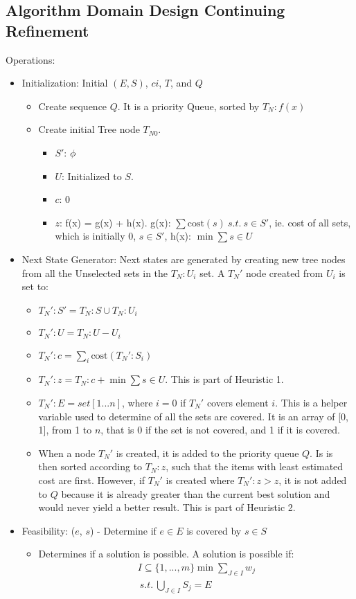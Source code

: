 \documentclass[12pt]{article}
\begin{document}
	\subsection{Algorithm Domain Design Continuing Refinement}
	
	Operations:
	\begin{itemize}
		\item Initialization: Initial $(E, S)$, $ci$, $T$, and $Q$
		\begin{itemize}
			\item Create sequence $Q$. It is a priority Queue, sorted by $T_N : f(x)$
			\item Create initial Tree node $T_{N0}$.
			\begin{itemize}
				\item $S\prime$: $\phi$
				\item $U$: Initialized to $S$.
				\item $c$: 0
				\item $z$: f(x) = g(x) + h(x). g(x): $\sum \text{cost}(s) \: s.t. \: s \in S\prime$, ie. cost of all sets, which is initially 0, $s \in S\prime$, h(x): $\min \sum s \in U$
			\end{itemize}
		\end{itemize}
		\item Next State Generator: Next states are generated by creating new tree nodes from all the Unselected sets in the $T_N : U_i$ set. A $T_N\prime$ node created from $U_i$ is set to:
		\begin{itemize}
			\item $T_N\prime : S\prime = T_N : S \cup T_N : U_i$
			\item $T_N\prime : U = T_N : U - U_i$
			\item $T_N\prime : c = \sum_i \text{cost}(T_N\prime : S_i)$ 
			\item $T_N\prime : z = T_N : c + \min \sum s \in U$. This is part of Heuristic 1.
			\item $T_N\prime : E = set [1...n]$, where $i = 0$ if $T_N\prime$ covers element $i$. This is a helper variable used to determine of all the sets are covered. It is an array of [0, 1], from 1 to $n$, that is 0 if the set is not covered, and 1 if it is covered. 
			\item When a node $T_N\prime$ is created, it is added to the priority queue $Q$. Is is then sorted according to $T_N : z$, such that the items with least estimated cost are first. However, if $T_N\prime$ is created where $T_N\prime : z > z$, it is not added to $Q$ because it is already greater than the current best solution and would never yield a better result. This is part of Heuristic 2.
		\end{itemize}
		\item Feasibility: ($e$, $s$) - Determine if $e \in E$ is covered by $s \in S$ 
		\begin{itemize}
			\item Determines if a solution is possible. A solution is possible if: \begin{align*}
			I \subseteq \{1,...,m\} \min \sum_{J \in I} w_j \\
			\:s.t.\: \bigcup_{J \in I} S_j = E
			\end{align*}
			

\end{itemize}
\end{itemize}
\end{document}
